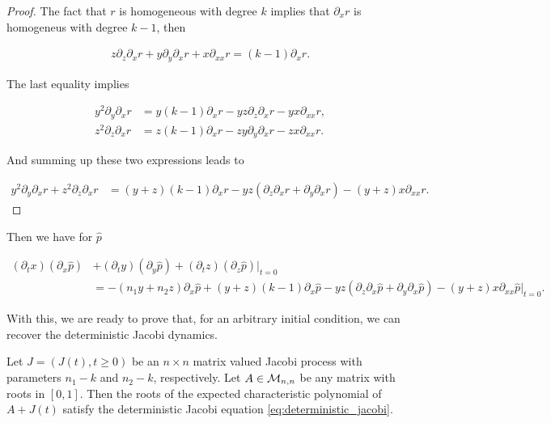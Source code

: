     \begin{proof}
        The fact that $r$ is homogeneous with degree $k$ implies that $\partial_x r$ is homogeneus with degree $k-1$, then

        \begin{align*}
            z\partial_z\partial_x r + y \partial_y\partial_x r + x \partial_{xx}r = (k-1)\partial_x r.
        \end{align*}

        The last equality implies

        \begin{align*}
            y^2 \partial_y \partial_x r &= y(k-1)\partial_x r - yz\partial_z\partial_x r - yx\partial_{xx}r,\\
            z^2 \partial_z \partial_x r &= z(k-1)\partial_x r - zy\partial_y\partial_x r - zx\partial_{xx}r.
        \end{align*}

        And summing up these two expressions leads to

        \begin{align*}
            y^2\partial_y\partial_x r + z^2\partial_z\partial_x r &= (y+z)(k-1)\partial_x r - yz (\partial_z\partial_x r + \partial_y\partial_x r) - (y+z)x\partial_{xx} r.
        \end{align*}
    \end{proof}

    Then we have for $\hat p$

    \begin{align*}
        (\partial_t x)(\partial_x \hat p) &+ (\partial_t y)(\partial_y \hat p) + (\partial_t z)(\partial_z \hat p)|_{t=0} \\ 
        &= -(n_1y + n_2 z)\partial_x \hat p + (y+z)(k-1)\partial_x \hat p - yz (\partial_z\partial_x \hat p + \partial_y\partial_x \hat p) - (y+z)x\partial_{xx} \hat p|_{t=0}.
    \end{align*}

    With this, we are ready to prove that, for an arbitrary initial condition, we can recover the deterministic Jacobi dynamics.

    \begin{theorem}
        Let $J = (J(t), t \ge 0)$ be an $n\times n$ matrix valued Jacobi process with parameters $n_1 - k$ and $n_2 - k$, respectively. Let $A \in \mathcal M_{n,n}$ be any matrix with roots in $[0,1]$. Then the roots of the expected characteristic polynomial of $A + J(t)$ satisfy the deterministic Jacobi equation \eqref{eq:deterministic_jacobi}.
    \end{theorem}

